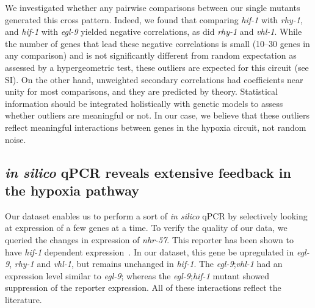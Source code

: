 \documentclass[9pt,twocolumn,twoside]{pnas-new}
\newcommand{\egl}{\emph{egl-9}}
\newcommand{\rhy}{\emph{rhy-1}}
\newcommand{\vhl}{\emph{vhl-1}}
\newcommand{\hif}{\emph{hif-1}}
\newcommand{\nhr}{\emph{nhr-57}}
\begin{document}
We investigated whether any pairwise comparisons between our single mutants generated this cross pattern. Indeed, we found that comparing \hif{} with \rhy{}, and \hif{} with \egl{} yielded negative correlations, as did \rhy{} and \vhl{}. While the number of genes that lead these negative correlations is small (10--30 genes in any comparison) and is not significantly different from random expectation as assessed by a hypergeometric test, these outliers are expected for this circuit (see SI). On the other hand, unweighted secondary correlations had coefficients near unity for most comparisons, and they are predicted by theory. Statistical information should be integrated holistically with genetic models to assess whether outliers are meaningful or not. In our case, we believe that these outliers reflect meaningful interactions between genes in the hypoxia circuit, not random noise.


\subsection{\emph{in silico} qPCR reveals extensive feedback in the hypoxia pathway}
\label{sub:qPCR}
Our dataset enables us to perform a sort of \emph{in silico} qPCR by selectively looking at expression of a few genes at a time. To verify the quality of our data, we queried the changes in expression of \nhr{}. This reporter has been shown to have \hif{} dependent expression~\cite{Shen2006,Shen2005,Ackerman2012,Park2012}. In our dataset, this gene be upregulated in \egl{}, \rhy{} and \vhl{}, but remains unchanged in \hif{}.
The \egl{};\vhl{} had an expression level similar to \egl{}; whereas the \egl{};\hif{} mutant showed suppression of the reporter expression. All of these interactions reflect the literature.
\end{document}
